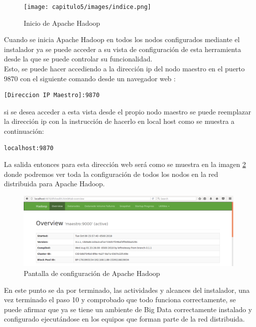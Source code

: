 \begin{figure}[H]
	\hypertarget{fig:inicio}{\hspace{1pt}}
	\begin{center}	
		\texttt{[image: capitulo5/images/indice.png]}
		\caption{Inicio de Apache Hadoop}
		\label{fig:inicio}
	\end{center}
\end{figure}
Cuando se inicia Apache Hadoop en todos los nodos configurados mediante el instalador ya se puede acceder a su vista de configuración de esta herramienta desde la que se puede controlar su funcionalidad.
\\
Esto, se puede hacer accediendo a la dirección ip del nodo maestro en el puerto 9870 con el siguiente comando desde un navegador web :
\begin{verbatim}
[Direccion IP Maestro]:9870
\end{verbatim}
si se desea acceder a esta vista desde el propio nodo maestro se puede reemplazar la dirección ip con la instrucción de hacerlo en local host como se muestra a continuación:
\begin{verbatim}
localhost:9870
\end{verbatim}
La salida entonces para esta dirección web será como se muestra en la imagen \ref{fig:confi} donde podremos ver toda la configuración de todos los nodos en la red distribuida para Apache Hadoop. 

\begin{figure}[H]
	\hypertarget{fig:confi}{\hspace{1pt}}
	\begin{center}	
		\includegraphics[width=1\textwidth]{capitulo5/images/im54.png}
		\caption{Pantalla de configuración de Apache Hadoop}
		\label{fig:confi}
	\end{center}
\end{figure}
En este punto se da por terminado, las actividades y alcances del instalador, una vez terminado el paso 10 y comprobado que todo funciona correctamente, se puede afirmar que ya se tiene un ambiente de Big Data correctamente instalado y configurado ejecutándose en los equipos que forman parte de la red distribuida.


